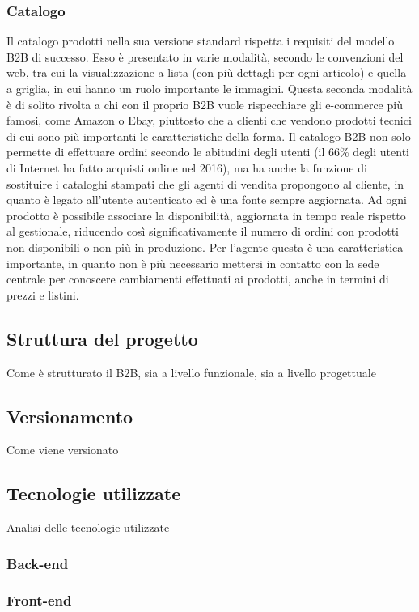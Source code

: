 \subsubsection{Catalogo}
Il catalogo prodotti nella sua versione standard rispetta i requisiti del modello B2B di successo. Esso è presentato in varie modalità, secondo le convenzioni del web, tra cui la visualizzazione a lista (con più dettagli per ogni articolo) e quella a griglia, in cui hanno un ruolo importante le immagini. Questa seconda modalità è di solito rivolta a chi con il proprio B2B vuole rispecchiare gli e-commerce più famosi, come Amazon o Ebay, piuttosto che a clienti che vendono prodotti tecnici di cui sono più importanti le caratteristiche della forma. Il catalogo B2B non solo permette di effettuare ordini secondo le abitudini degli utenti (il 66\% degli utenti di Internet ha fatto acquisti online nel 2016\autocite{eurostat}), ma ha anche la funzione di sostituire i cataloghi stampati che gli agenti di vendita propongono al cliente, in quanto è legato all'utente autenticato ed è una fonte sempre aggiornata. Ad ogni prodotto è possibile associare la disponibilità, aggiornata in tempo reale rispetto al gestionale, riducendo così significativamente il numero di ordini con prodotti non disponibili o non più in produzione. Per l'agente questa è una caratteristica importante, in quanto non è più necessario mettersi in contatto con la sede centrale per conoscere cambiamenti effettuati ai prodotti, anche in termini di prezzi e listini.

\subsection{Struttura del progetto}
Come è strutturato il B2B, sia a livello funzionale, sia a livello progettuale
\subsection{Versionamento}
Come viene versionato
\subsection{Tecnologie utilizzate}
Analisi delle tecnologie utilizzate
\subsubsection{Back-end}
\subsubsection{Front-end}